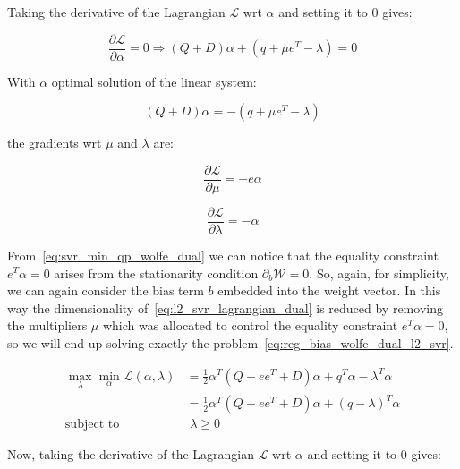 Taking the derivative of the Lagrangian $\mathcal{L}$ wrt $\alpha$ and setting it to 0 gives:

\begin{equation} \label{eq:l2_svr_lagrangian_der_a}
	\frac{\partial \mathcal{L}}{\partial \alpha}=0\Rightarrow (Q+D) \alpha + (q + \mu e^T - \lambda) = 0
\end{equation}

With $\alpha$ optimal solution of the linear system:

\begin{equation} \label{eq:l2_svr_lagrangian_sol}
    (Q+D) \alpha = - (q + \mu e^T - \lambda)
\end{equation}

the gradients wrt $\mu$ and $\lambda$ are:

\begin{equation} \label{eq:l2_svr_lagrangian_der_mu}
	\frac{\partial \mathcal{L}}{\partial \mu}=-e \alpha
\end{equation}

\begin{equation} \label{eq:l2_svr_lagrangian_der_lalbda}
    \frac{\partial \mathcal{L}}{\partial \lambda}=-\alpha
\end{equation}

From~\eqref{eq:svr_min_qp_wolfe_dual} we can notice that the equality constraint $e^T \alpha = 0$ arises from the stationarity condition $\partial_{{b}} \mathcal{W}=0$. So, again, for simplicity, we can again consider the bias term $b$ embedded into the weight vector. In this way the dimensionality of~\eqref{eq:l2_svr_lagrangian_dual} is reduced by removing the multipliers $\mu$ which was allocated to control the equality constraint $e^T \alpha=0$, so we will end up solving exactly the problem~\eqref{eq:reg_bias_wolfe_dual_l2_svr}.

\begin{equation} \label{eq:l2_svr_lb_lagrangian_dual}
	\begin{aligned}
    	\max_{\lambda} \min_{\alpha} \mathcal{L}(\alpha,\lambda) &= \frac{1}{2} \alpha^T (Q + ee^T + D) \alpha+q^T\alpha - \lambda^T \alpha \\
    &= \frac{1}{2} \alpha^T (Q + ee^T + D)\alpha + (q - \lambda)^T \alpha \\
    \text{subject to} \quad & \,\, \lambda \geq 0
	\end{aligned}
\end{equation}

Now, taking the derivative of the Lagrangian $\mathcal{L}$ wrt $\alpha$ and setting it to 0 gives:

